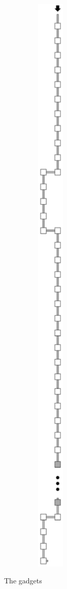 \begin{figure}[H]
\begin{subfigure}[t]{0.3\textwidth}
        \caption{\label{fig:read_next_1_op_msr}}
    \end{subfigure}%
    ~
    \begin{subfigure}[t]{0.3\textwidth}
        \centering
        \includegraphics[width=0.3\textwidth]{return_paths/read_next_1-or-2_op_msr_msd}
        \caption{\label{fig:read_next_1or2_op_msr_msd}}
    \end{subfigure}%
    \caption{\label{fig:readnext} The {\readnext} gadgets}
\end{figure}

